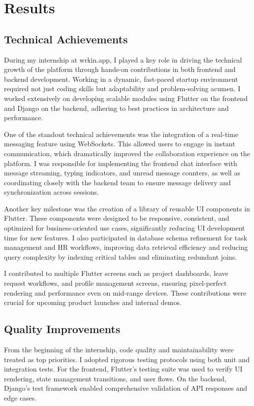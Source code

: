 \chapter{Results}

\section{Technical Achievements}

During my internship at wrkin.app, I played a key role in driving the technical growth of the platform through hands-on contributions in both frontend and backend development. Working in a dynamic, fast-paced startup environment required not just coding skills but adaptability and problem-solving acumen. I worked extensively on developing scalable modules using Flutter on the frontend and Django on the backend, adhering to best practices in architecture and performance.

One of the standout technical achievements was the integration of a real-time messaging feature using WebSockets. This allowed users to engage in instant communication, which dramatically improved the collaboration experience on the platform. I was responsible for implementing the frontend chat interface with message streaming, typing indicators, and unread message counters, as well as coordinating closely with the backend team to ensure message delivery and synchronization across sessions.

Another key milestone was the creation of a library of reusable UI components in Flutter. These components were designed to be responsive, consistent, and optimized for business-oriented use cases, significantly reducing UI development time for new features. I also participated in database schema refinement for task management and HR workflows, improving data retrieval efficiency and reducing query complexity by indexing critical tables and eliminating redundant joins.

I contributed to multiple Flutter screens such as project dashboards, leave request workflows, and profile management screens, ensuring pixel-perfect rendering and performance even on mid-range devices. These contributions were crucial for upcoming product launches and internal demos.

\section{Quality Improvements}

From the beginning of the internship, code quality and maintainability were treated as top priorities. I adopted rigorous testing protocols using both unit and integration tests. For the frontend, Flutter’s testing suite was used to verify UI rendering, state management transitions, and user flows. On the backend, Django’s test framework enabled comprehensive validation of API responses and edge cases.

